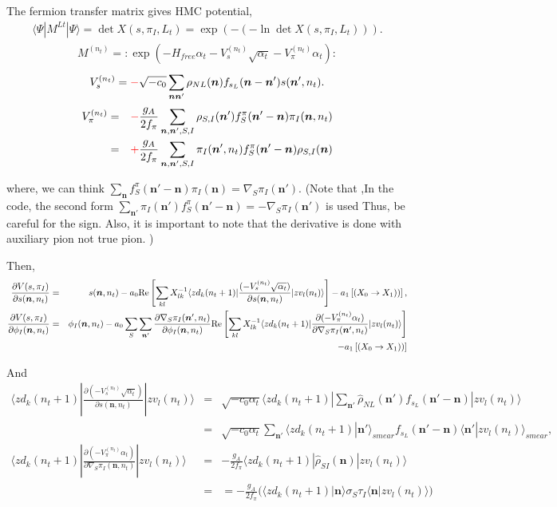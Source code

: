 \documentclass[10pt]{book}
\def\bm{\boldsymbol}
\newcommand{\bea}{\begin{eqnarray}}
\newcommand{\eea}{\end{eqnarray}}
\newcommand{\no}{\nonumber \\}
\newcommand{\del}{\partial}
\def\vn{{\bm n}}
\def\la{\langle}
\def\ra{\rangle}
\begin{document}
The fermion transfer matrix gives HMC potential,
\bea 
\la \Psi|M^{Lt}|\Psi\ra = \det X(s,\pi_I,L_t)=\exp(-(-\ln \det X(s,\pi_I,L_t))).
\eea 
\bea 
M^{(n_t)}=:\exp\left(-H_{free}\alpha_t-V_s^{(n_t)}\sqrt{\alpha_t}
-V_\pi^{(n_t)}\alpha_t  \right):
\eea 
\bea 
V_{s}^{(n_t)}={\color{red}-}\sqrt{-c_0}\sum_{\vn\vn'}\rho_{NL}(\vn)f_{s_L}(\vn-\vn')s(\vn',n_t).
\eea 
\bea 
V_{\pi}^{(n_t)}&=&{\color{red}-}\frac{g_A}{2f_\pi}\sum_{\vn,\vn',S,I}\rho_{S,I}(\vn')f^\pi_S(\vn'-\vn)\pi_I(\vn,n_t)
\no 
&=&{\color{red}+}\frac{g_A}{2f_\pi}\sum_{\vn,\vn',S,I} \pi_I(\vn',n_t)f^\pi_S(\vn'-\vn)\rho_{S,I}(\vn)
\eea 

where, we can think 
$\sum_{\vn}f_S^\pi(\vn'-\vn)\pi_I(\vn)=\nabla_S \pi_I (\vn')$.
(Note that ,In the code, 
the second form $\sum_{\vn'}\pi_I(\vn') f_S^\pi(\vn'-\vn)=-\nabla_S \pi_I (\vn')$ is used
Thus, be careful for the sign. Also, it is important to note that the derivative is done with auxiliary pion
not true pion. )

Then,
\bea 
\frac{\del V(s,\pi_I)}{\del s(\vn,n_t)}
&=& s(\vn,n_t)- a_0 {\rm Re}\left[ \sum_{kl} X^{-1}_{lk} 
            \la zd_k(n_t+1)|\frac{(-V_{s}^{(n_t)}\sqrt{\alpha_t})}{\del s(\vn,n_t)}| zv_l (n_t)\ra  
                 \right] 
            - a_1 \left[ (X_0\to X_1))     \right] ,\no 
\frac{\del V(s,\pi_I)}{\del \phi_I(\vn,n_t)}
&=& \phi_I(\vn,n_t)- a_0 \sum_{S}\sum_{\vn'} 
 \frac{\del \nabla_S\pi_I(\vn',n_t)}{\del \phi_I(\vn,n_t)}
{\rm Re}\left[ \sum_{kl} X^{-1}_{lk} 
 \la zd_k(n_t+1)|\frac{\del (-V_{\pi}^{(n_t)}\alpha_t) }{\del \nabla_S\pi_I(\vn',n_t)}
| zv_l (n_t)\ra  
\right]  \no & &
- a_1 \left[ (X_0\to X_1))     \right]            
\eea 

And
\bea 
\la zd_k(n_t+1)|\frac{\del (-V_{s}^{(n_t)}\sqrt{\alpha_t})}{\del s(\vn,n_t)}| zv_l (n_t)\ra 
&=&
 \sqrt{-c_0\alpha_t}\la zd_k(n_t+1)| \sum_{\vn'} \hat{\rho}_{NL}(\vn') f_{s_L}(\vn'-\vn)| zv_l (n_t)\ra \no 
&=& \sqrt{-c_0\alpha_t} \sum_{\vn'} \la zd_k(n_t+1)|\vn'\ra_{smear} f_{s_L}(\vn'-\vn)\la \vn'| zv_l (n_t)\ra_{smear}
 , \no                                  
\la zd_k(n_t+1)|\frac{\del (-V_{\pi}^{(n_t)}\alpha_t)}{\del \nabla_S\pi_I(\vn,n_t)}
| zv_l (n_t)\ra
&=&  -\frac{g_A}{2f_\pi}  
   \la zd_k(n_t+1)|\hat{\rho}_{SI}(\vn)| zv_l (n_t)\ra \no 
   &=& 
    = -\frac{g_A}{2f_\pi}  \Big(\la zd_k(n_t+1)|\vn\ra \sigma_S \tau_I \la \vn | zv_l (n_t)\ra \Big)
\eea 
\end{document}
